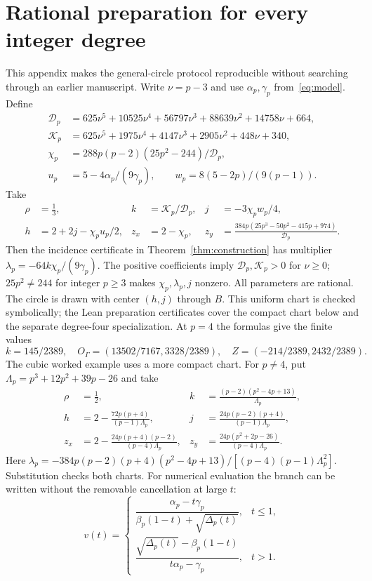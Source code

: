 \documentclass[11pt,a4paper]{article}
\begin{document}
\section{Rational preparation for every integer degree}\label{app:prep}
This appendix makes the general-circle protocol reproducible without searching through an earlier manuscript. Write $\nu=p-3$ and use $\alpha_p,\gamma_p$ from~\eqref{eq:model}. Define
\begin{align*}
 \mathcal D_p&=625\nu^5+10525\nu^4+56797\nu^3+88639\nu^2+14758\nu+664,\\
 \mathcal K_p&=625\nu^5+1975\nu^4+4147\nu^3+2905\nu^2+448\nu+340,\\
 \chi_p&=288p(p-2)(25p^2-244)/\mathcal D_p,\\
 u_p&=5-4\alpha_p/(9\gamma_p),\qquad w_p=8(5-2p)/(9(p-1)).
\end{align*}
Take
\begin{align*}
 \rho&=\tfrac13,& k&=\mathcal K_p/\mathcal D_p,& j&=-3\chi_pw_p/4,\\
 h&=2+2j-\chi_pu_p/2,&z_x&=2-\chi_p,&
 z_y&=\frac{384p(25p^3-50p^2-415p+974)}{\mathcal D_p}.
\end{align*}
Then the incidence certificate in Theorem~\ref{thm:construction} has multiplier $\lambda_p=-64k\chi_p/(9\gamma_p)$. The positive coefficients imply $\mathcal D_p,\mathcal K_p>0$ for $\nu\ge0$; $25p^2\ne244$ for integer $p\ge3$ makes $\chi_p,\lambda_p,j$ nonzero. All parameters are rational. The circle is drawn with center $(h,j)$ through $B$. This uniform chart is checked symbolically; the Lean preparation certificates cover the compact chart below and the separate degree-four specialization.
At $p=4$ the formulas give the finite values
\[
 k=145/2389,\quad O_\Gamma=(13502/7167,3328/2389),\quad
 Z=(-214/2389,2432/2389).
\]
The cubic worked example uses a more compact chart. For $p\ne4$, put $\Lambda_p=p^3+12p^2+39p-26$ and take
\begin{align*}
 \rho&=\tfrac12,& k&=\frac{(p-2)(p^2-4p+13)}{\Lambda_p},\\
 h&=2-\frac{72p(p+4)}{(p-1)\Lambda_p},&
 j&=\frac{24p(p-2)(p+4)}{(p-1)\Lambda_p},\\
 z_x&=2-\frac{24p(p+4)(p-2)}{(p-4)\Lambda_p},&
 z_y&=\frac{24p(p^2+2p-26)}{(p-4)\Lambda_p}.
\end{align*}
Here $\lambda_p=-384p(p-2)(p+4)(p^2-4p+13)/[(p-4)(p-1)\Lambda_p^2]$. Substitution checks both charts. For numerical evaluation the branch can be written without the removable cancellation at large $t$:
\[
 v(t)=\begin{cases}
 \dfrac{\alpha_p-t\gamma_p}{\beta_p(1-t)+\sqrt{\Delta_p(t)}},&t\le1,\\[5pt]
 \dfrac{\sqrt{\Delta_p(t)}-\beta_p(1-t)}{t\alpha_p-\gamma_p},&t>1.
 \end{cases}
\]
\end{document}
